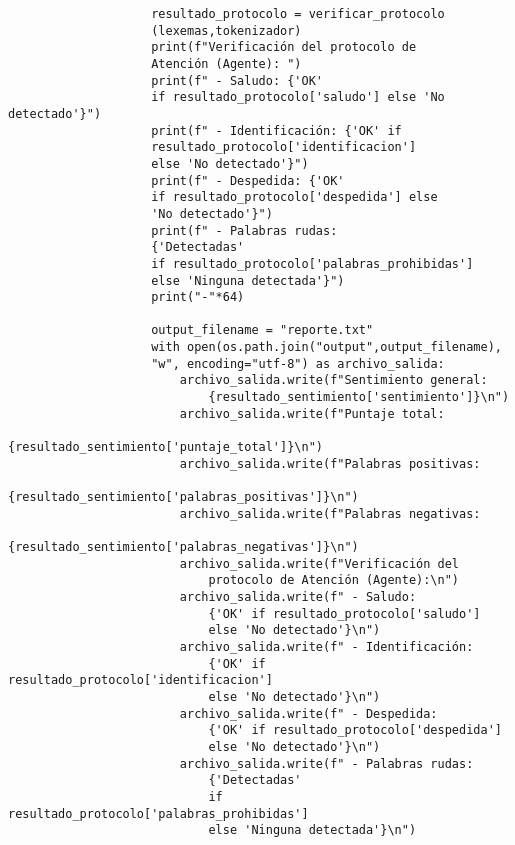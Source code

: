 \documentclass[12pt,a4paper]{scrartcl} %
\begin{document}
\begin{verbatim}
                    resultado_protocolo = verificar_protocolo
                    (lexemas,tokenizador)
                    print(f"Verificación del protocolo de 
                    Atención (Agente): ")
                    print(f" - Saludo: {'OK' 
                    if resultado_protocolo['saludo'] else 'No detectado'}")
                    print(f" - Identificación: {'OK' if 
                    resultado_protocolo['identificacion'] 
                    else 'No detectado'}")
                    print(f" - Despedida: {'OK' 
                    if resultado_protocolo['despedida'] else 
                    'No detectado'}")
                    print(f" - Palabras rudas: 
                    {'Detectadas' 
                    if resultado_protocolo['palabras_prohibidas'] 
                    else 'Ninguna detectada'}")
                    print("-"*64)

                    output_filename = "reporte.txt"
                    with open(os.path.join("output",output_filename), 
                    "w", encoding="utf-8") as archivo_salida:
                        archivo_salida.write(f"Sentimiento general: 
                            {resultado_sentimiento['sentimiento']}\n")
                        archivo_salida.write(f"Puntaje total: 
                            {resultado_sentimiento['puntaje_total']}\n")
                        archivo_salida.write(f"Palabras positivas: 
                            {resultado_sentimiento['palabras_positivas']}\n")
                        archivo_salida.write(f"Palabras negativas: 
                            {resultado_sentimiento['palabras_negativas']}\n")
                        archivo_salida.write(f"Verificación del 
                            protocolo de Atención (Agente):\n")
                        archivo_salida.write(f" - Saludo: 
                            {'OK' if resultado_protocolo['saludo'] 
                            else 'No detectado'}\n")
                        archivo_salida.write(f" - Identificación: 
                            {'OK' if resultado_protocolo['identificacion'] 
                            else 'No detectado'}\n")
                        archivo_salida.write(f" - Despedida: 
                            {'OK' if resultado_protocolo['despedida'] 
                            else 'No detectado'}\n")
                        archivo_salida.write(f" - Palabras rudas: 
                            {'Detectadas' 
                            if resultado_protocolo['palabras_prohibidas'] 
                            else 'Ninguna detectada'}\n")


\end{verbatim}
\end{document}
